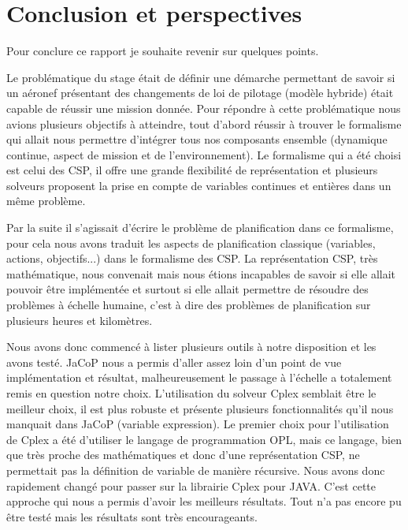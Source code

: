 \chapter{Conclusion et perspectives}
Pour conclure ce rapport je souhaite revenir sur quelques points. 

Le problématique du stage était de définir une démarche permettant de savoir si un aéronef présentant des changements de loi de pilotage (modèle hybride) était capable de réussir une mission donnée. Pour répondre à cette problématique nous avions plusieurs objectifs à atteindre, tout d'abord réussir à trouver le formalisme qui allait nous permettre d'intégrer tous nos composants ensemble (dynamique continue, aspect de mission et de l'environnement). Le formalisme qui a été choisi est celui des CSP, il offre une grande flexibilité de représentation et plusieurs solveurs proposent la prise en compte de variables continues et entières dans un même problème.

Par la suite il s'agissait d'écrire le problème de planification dans ce formalisme, pour cela nous avons traduit les aspects de planification classique (variables, actions, objectifs...) dans le formalisme des CSP. La représentation CSP, très mathématique, nous convenait mais nous étions incapables de savoir si elle allait pouvoir être implémentée et surtout si elle allait permettre de résoudre des problèmes à échelle humaine, c'est à dire des problèmes de planification sur plusieurs heures et kilomètres.

Nous avons donc commencé à lister plusieurs outils à notre disposition et les avons testé. JaCoP nous a permis d'aller assez loin d'un point de vue implémentation et résultat, malheureusement le passage à l'échelle a totalement remis en question notre choix. L'utilisation du solveur Cplex semblait être le meilleur choix, il est plus robuste et présente plusieurs fonctionnalités qu'il nous manquait dans JaCoP (variable expression). Le premier choix pour l'utilisation de Cplex a été d'utiliser le langage de programmation OPL, mais ce langage, bien que très proche des mathématiques et donc d'une représentation CSP, ne permettait pas la définition de variable de manière récursive. Nous avons donc rapidement changé pour passer sur la librairie Cplex pour JAVA. C'est cette approche qui nous a permis d'avoir les meilleurs résultats. Tout n'a pas encore pu être testé mais les résultats sont très encourageants.

